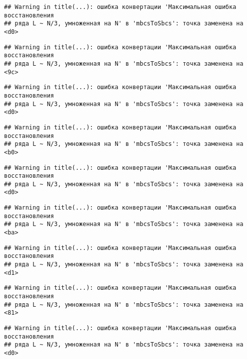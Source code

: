 \documentclass[
]{article}
\begin{document}
\begin{verbatim}
## Warning in title(...): ошибка конвертации 'Максимальная ошибка восстановления
## ряда L ~ N/3, умноженная на N' в 'mbcsToSbcs': точка заменена на <d0>
\end{verbatim}

\begin{verbatim}
## Warning in title(...): ошибка конвертации 'Максимальная ошибка восстановления
## ряда L ~ N/3, умноженная на N' в 'mbcsToSbcs': точка заменена на <9c>
\end{verbatim}

\begin{verbatim}
## Warning in title(...): ошибка конвертации 'Максимальная ошибка восстановления
## ряда L ~ N/3, умноженная на N' в 'mbcsToSbcs': точка заменена на <d0>
\end{verbatim}

\begin{verbatim}
## Warning in title(...): ошибка конвертации 'Максимальная ошибка восстановления
## ряда L ~ N/3, умноженная на N' в 'mbcsToSbcs': точка заменена на <b0>
\end{verbatim}

\begin{verbatim}
## Warning in title(...): ошибка конвертации 'Максимальная ошибка восстановления
## ряда L ~ N/3, умноженная на N' в 'mbcsToSbcs': точка заменена на <d0>
\end{verbatim}

\begin{verbatim}
## Warning in title(...): ошибка конвертации 'Максимальная ошибка восстановления
## ряда L ~ N/3, умноженная на N' в 'mbcsToSbcs': точка заменена на <ba>
\end{verbatim}

\begin{verbatim}
## Warning in title(...): ошибка конвертации 'Максимальная ошибка восстановления
## ряда L ~ N/3, умноженная на N' в 'mbcsToSbcs': точка заменена на <d1>
\end{verbatim}

\begin{verbatim}
## Warning in title(...): ошибка конвертации 'Максимальная ошибка восстановления
## ряда L ~ N/3, умноженная на N' в 'mbcsToSbcs': точка заменена на <81>
\end{verbatim}

\begin{verbatim}
## Warning in title(...): ошибка конвертации 'Максимальная ошибка восстановления
## ряда L ~ N/3, умноженная на N' в 'mbcsToSbcs': точка заменена на <d0>
\end{verbatim}
\end{document}
